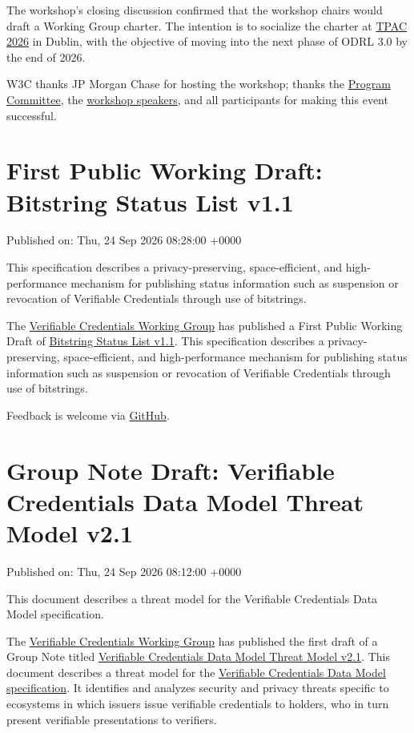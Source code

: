 \documentclass[11pt,a4paper]{article}
\begin{document}
The workshop's closing discussion confirmed that the workshop chairs would draft a Working Group charter. The intention is to socialize the charter at \href{https://www.w3.org/news-events/tpac/2026/}{TPAC 2026} in Dublin, with the objective of moving into the next phase of ODRL 3.0 by the end of 2026.

W3C thanks JP Morgan Chase for hosting the workshop; thanks the \href{https://www.w3.org/2026/ODRLWS/index.html\#program-committee}{Program Committee}, the \href{https://www.w3.org/2026/ODRLWS/agenda.html}{workshop speakers}, and all participants for making this event successful.

\section{First Public Working Draft: Bitstring Status List v1.1}

Published on: Thu, 24 Sep 2026 08:28:00 +0000

This specification describes a privacy-preserving, space-efficient, and high-performance mechanism for publishing status information such as suspension or revocation of Verifiable Credentials through use of bitstrings.

The \href{https://www.w3.org/groups/wg/vc}{Verifiable Credentials Working Group} has published a First Public Working Draft of \href{https://www.w3.org/TR/2026/WD-vc-bitstring-status-list-1.1-20260924/}{Bitstring Status List v1.1}. This specification describes a privacy-preserving, space-efficient, and high-performance mechanism for publishing status information such as suspension or revocation of Verifiable Credentials through use of bitstrings.

Feedback is welcome via \href{https://github.com/w3c/vc-bitstring-status-list/}{GitHub}.

\section{Group Note Draft: Verifiable Credentials Data Model Threat Model v2.1}

Published on: Thu, 24 Sep 2026 08:12:00 +0000

This document describes a threat model for the Verifiable Credentials Data Model specification.

The \href{https://www.w3.org/groups/wg/vc}{Verifiable Credentials Working Group} has published the first draft of a Group Note titled \href{https://www.w3.org/TR/2026/DNOTE-vc-data-model-threat-model-2.1-20260924/}{Verifiable Credentials Data Model Threat Model v2.1}. This document describes a threat model for the \href{https://www.w3.org/TR/vc-data-model/}{Verifiable Credentials Data Model specification}. It identifies and analyzes security and privacy threats specific to ecosystems in which issuers issue verifiable credentials to holders, who in turn present verifiable presentations to verifiers.
\end{document}
